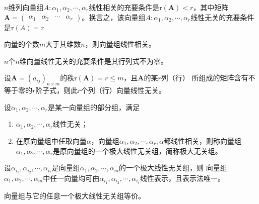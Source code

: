 \begin{theorem}
    $n$维列向量组$A:\alpha_1,\alpha_2,\cdots,\alpha_r$线性相关的充要条件是$\mathrm{r}(\boldsymbol{A})<r$，其中矩阵
    $\boldsymbol{A}=\left(\begin{array}{cccc}
        \alpha_1 & \alpha_2 & \cdots & \alpha_r 
    \end{array}\right)$。换言之，该向量组$A:\alpha_1,\alpha_2,\cdots,\alpha_r$线性无关的充要条件是$\mathrm{r}(A)=r$
\end{theorem}

\begin{theorem}
    向量的个数$m$大于其维数$n$，则向量组线性相关。
\end{theorem}

\begin{theorem}
    $n$个$n$维向量线性无关的充要条件是其行列式不为零。
\end{theorem}

\begin{theorem}
    设$\boldsymbol{A}=(a_{ij})_{n\times m}$的秩$\mathrm{r}(\boldsymbol{A})=r\leq m$，且$\boldsymbol{A}$的某$r$列（行）
    所组成的矩阵含有不等于零的$r$阶子式，则此$r$个列（行）向量线性无关。
\end{theorem}

\begin{definition}[极大无关组]
    设$\alpha_1,\alpha_2,\cdots,\alpha_r$是某一向量组的部分组，满足
    \begin{enumerate}[(1)]
        \item $\alpha_1,\alpha_2,\cdots,\alpha_r$线性无关；
        \item 在原向量组中任取向量$\alpha$，向量组$\alpha_1,\alpha_2,\cdots,\alpha_r,\alpha$都线性相关，则称向量组
        $\alpha_1,\alpha_2,\cdots,\alpha_r$是原向量组的一个极大线性无关组，简称{\heiti 极大无关组}。
    \end{enumerate}
\end{definition}

\begin{theorem}
    设$\alpha_{i_1},\alpha_{i_2},\cdots,\alpha_{i_r}$是向量组$\alpha_1,\alpha_2,\cdots,\alpha_m$的一个极大线性无关组，则
    向量组$\alpha_1,\alpha_2,\cdots,\alpha_m$中任一向量均可由$\alpha_{i_1},\alpha_{i_2},\cdots,\alpha_{i_r}$线性表示，且表示法唯一。
\end{theorem}

\begin{theorem}
    向量组与它的任意一个极大线性无关组等价。
\end{theorem}


